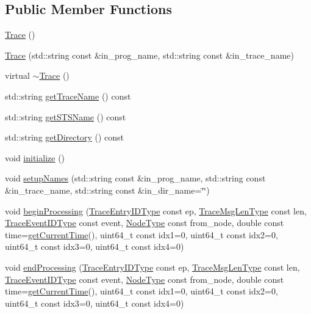 \subsection*{Public Member Functions}
\begin{DoxyCompactItemize}
\item 
\hyperlink{structvt_1_1trace_1_1_trace_aaa01903c742a455c14331d0f3870285b}{Trace} ()
\item 
\hyperlink{structvt_1_1trace_1_1_trace_a33a81cc28bd249ed5b962cf314cb1873}{Trace} (std\+::string const \&in\+\_\+prog\+\_\+name, std\+::string const \&in\+\_\+trace\+\_\+name)
\item 
virtual \hyperlink{structvt_1_1trace_1_1_trace_a80b3426aed07572525ef4834b0c4dedd}{$\sim$\+Trace} ()
\item 
std\+::string \hyperlink{structvt_1_1trace_1_1_trace_a6825144c1fb635304c957dee8f667b4a}{get\+Trace\+Name} () const
\item 
std\+::string \hyperlink{structvt_1_1trace_1_1_trace_af92da7879adc530c72945530b0bfa11d}{get\+S\+T\+S\+Name} () const
\item 
std\+::string \hyperlink{structvt_1_1trace_1_1_trace_ae2e8213035c557a769cf0fd1a41533a5}{get\+Directory} () const
\item 
void \hyperlink{structvt_1_1trace_1_1_trace_a1fbfe3f8e6c19d8cfacb9bad97c45069}{initialize} ()
\item 
void \hyperlink{structvt_1_1trace_1_1_trace_af06d0567bb3c4953f6fc61e996dacda1}{setup\+Names} (std\+::string const \&in\+\_\+prog\+\_\+name, std\+::string const \&in\+\_\+trace\+\_\+name, std\+::string const \&in\+\_\+dir\+\_\+name=\char`\"{}\char`\"{})
\item 
void \hyperlink{structvt_1_1trace_1_1_trace_a4106e70e0093724a1728dd638ab89d28}{begin\+Processing} (\hyperlink{namespacevt_1_1trace_a3c14050715ba9eceaeff51fb3de64f2f}{Trace\+Entry\+I\+D\+Type} const ep, \hyperlink{namespacevt_1_1trace_aeb598f45d67d41db7902e494f2f0ce59}{Trace\+Msg\+Len\+Type} const len, \hyperlink{namespacevt_1_1trace_a64a7185f3e102df8d8258f263ccd1582}{Trace\+Event\+I\+D\+Type} const event, \hyperlink{namespacevt_a866da9d0efc19c0a1ce79e9e492f47e2}{Node\+Type} const from\+\_\+node, double const time=\hyperlink{structvt_1_1trace_1_1_trace_a04cf6b76b4ced1bc90d246a34c948db5}{get\+Current\+Time}(), uint64\+\_\+t const idx1=0, uint64\+\_\+t const idx2=0, uint64\+\_\+t const idx3=0, uint64\+\_\+t const idx4=0)
\item 
void \hyperlink{structvt_1_1trace_1_1_trace_ad086d14a272d11f16b8eaead65bc685f}{end\+Processing} (\hyperlink{namespacevt_1_1trace_a3c14050715ba9eceaeff51fb3de64f2f}{Trace\+Entry\+I\+D\+Type} const ep, \hyperlink{namespacevt_1_1trace_aeb598f45d67d41db7902e494f2f0ce59}{Trace\+Msg\+Len\+Type} const len, \hyperlink{namespacevt_1_1trace_a64a7185f3e102df8d8258f263ccd1582}{Trace\+Event\+I\+D\+Type} const event, \hyperlink{namespacevt_a866da9d0efc19c0a1ce79e9e492f47e2}{Node\+Type} const from\+\_\+node, double const time=\hyperlink{structvt_1_1trace_1_1_trace_a04cf6b76b4ced1bc90d246a34c948db5}{get\+Current\+Time}(), uint64\+\_\+t const idx1=0, uint64\+\_\+t const idx2=0, uint64\+\_\+t const idx3=0, uint64\+\_\+t const idx4=0)

\end{DoxyCompactItemize}
